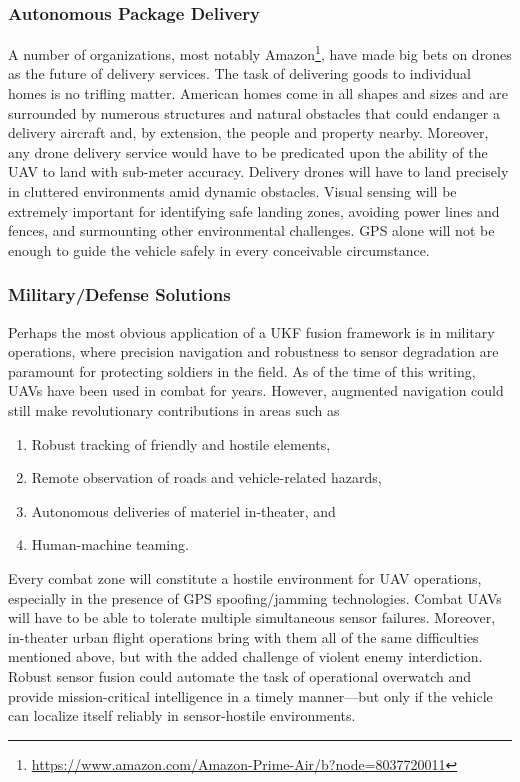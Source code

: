 \subsubsection{Autonomous Package Delivery}

A number of organizations, most notably Amazon\footnote{\url{https://www.amazon.com/Amazon-Prime-Air/b?node=8037720011}}, have made big bets on drones as the future of delivery services. The task of delivering goods to individual homes is no trifling matter. American homes come in all shapes and sizes and are surrounded by numerous structures and natural obstacles that could endanger a delivery aircraft and, by extension, the people and property nearby. Moreover, any drone delivery service would have to be predicated upon the ability of the UAV to land with sub-meter accuracy. Delivery drones will have to land precisely in cluttered environments amid dynamic obstacles. Visual sensing will be extremely important for identifying safe landing zones, avoiding power lines and fences, and surmounting other environmental challenges. GPS alone will not be enough to guide the vehicle safely in every conceivable circumstance. 

\subsubsection{Military/Defense Solutions}

Perhaps the most obvious application of a UKF fusion framework is in military operations, where precision navigation and robustness to sensor degradation are paramount for protecting soldiers in the field. As of the time of this writing, UAVs have been used in combat for years. However, augmented navigation could still make revolutionary contributions in areas such as
\begin{enumerate}
    \item Robust tracking of friendly and hostile elements,
    \item Remote observation of roads and vehicle-related hazards,
    \item Autonomous deliveries of materiel in-theater, and
    \item Human-machine teaming.
\end{enumerate}
Every combat zone will constitute a hostile environment for UAV operations, especially in the presence of GPS spoofing/jamming technologies. Combat UAVs will have to be able to tolerate multiple simultaneous sensor failures. Moreover, in-theater urban flight operations bring with them all of the same difficulties mentioned above, but with the added challenge of violent enemy interdiction. Robust sensor fusion could automate the task of operational overwatch and provide mission-critical intelligence in a timely manner---but only if the vehicle can localize itself reliably in sensor-hostile environments.